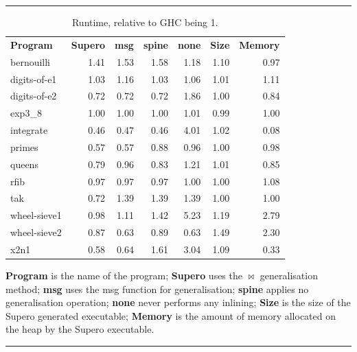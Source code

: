 \begin{table}[tb]
\hrule
\vspace{3mm}

\begin{tabular}{lrrrrrr}
\textbf{Program} & \hspace{5mm}\textbf{Supero} & \hspace{5mm}\textbf{msg} & \hspace{5mm}\textbf{spine} & \hspace{5mm}\textbf{none} & \hspace{5mm}\textbf{Size} & \hspace{5mm}\textbf{Memory} \\
bernouilli 		& 1.41 & 1.53 & 1.58 & 1.18 & 1.10 & 0.97 \\
digits-of-e1	& 1.03 & 1.16 & 1.03 & 1.06 & 1.01 & 1.11 \\
digits-of-e2	& 0.72 & 0.72 & 0.72 & 1.86 & 1.00 & 0.84 \\
exp3\_8			& 1.00 & 1.00 & 1.00 & 1.01 & 0.99 & 1.00 \\
integrate 		& 0.46 & 0.47 & 0.46 & 4.01 & 1.02 & 0.08 \\
primes 			& 0.57 & 0.57 & 0.88 & 0.96 & 1.00 & 0.98 \\
queens 			& 0.79 & 0.96 & 0.83 & 1.21 & 1.01 & 0.85 \\
rfib 			& 0.97 & 0.97 & 0.97 & 1.00 & 1.00 & 1.08 \\
tak 			& 0.72 & 1.39 & 1.39 & 1.39 & 1.00 & 1.00 \\
wheel-sieve1 	& 0.98 & 1.11 & 1.42 & 5.23 & 1.19 & 2.79 \\
wheel-sieve2 	& 0.87 & 0.63 & 0.89 & 0.63 & 1.49 & 2.30 \\
x2n1 			& 0.58 & 0.64 & 1.61 & 3.04 & 1.09 & 0.33 \\
\end{tabular}
\vspace{2mm}

\textbf{Program} is the name of the program; \textbf{Supero} uses the $\bowtie$ generalisation method; \textbf{msg} uses the msg function for generalisation; \textbf{spine} applies no generalisation operation; \textbf{none} never performs any inlining; \textbf{Size} is the size of the Supero generated executable; \textbf{Memory} is the amount of memory allocated on the heap by the Supero executable.

\vspace{4mm}
\hrule
\vspace{2mm}
\caption{Runtime, relative to GHC being 1.}
\label{tab:haskell_results}
\end{table}

